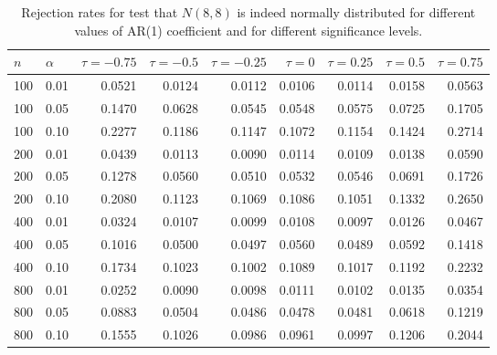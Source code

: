\begin{table}[ht]
\centering
\caption{Rejection rates for test that $N(8, 8)$ is indeed
                   normally distributed for
                   different values of AR(1) coefficient and for different 
                   significance levels.} 
\label{table:rr_norm}
\begin{tabular}{llrrrrrrr}
  \hline
$n$ & $\alpha$ & $\tau = -0.75$ & $\tau = -0.5$ & $\tau = -0.25$ & $\tau = 0$ & $\tau = 0.25$ & $\tau = 0.5$ & $\tau = 0.75$ \\ 
  \hline
100 & 0.01 & 0.0521 & 0.0124 & 0.0112 & 0.0106 & 0.0114 & 0.0158 & 0.0563 \\ 
  100 & 0.05 & 0.1470 & 0.0628 & 0.0545 & 0.0548 & 0.0575 & 0.0725 & 0.1705 \\ 
  100 & 0.10 & 0.2277 & 0.1186 & 0.1147 & 0.1072 & 0.1154 & 0.1424 & 0.2714 \\ 
  200 & 0.01 & 0.0439 & 0.0113 & 0.0090 & 0.0114 & 0.0109 & 0.0138 & 0.0590 \\ 
  200 & 0.05 & 0.1278 & 0.0560 & 0.0510 & 0.0532 & 0.0546 & 0.0691 & 0.1726 \\ 
  200 & 0.10 & 0.2080 & 0.1123 & 0.1069 & 0.1086 & 0.1051 & 0.1332 & 0.2650 \\ 
  400 & 0.01 & 0.0324 & 0.0107 & 0.0099 & 0.0108 & 0.0097 & 0.0126 & 0.0467 \\ 
  400 & 0.05 & 0.1016 & 0.0500 & 0.0497 & 0.0560 & 0.0489 & 0.0592 & 0.1418 \\ 
  400 & 0.10 & 0.1734 & 0.1023 & 0.1002 & 0.1089 & 0.1017 & 0.1192 & 0.2232 \\ 
  800 & 0.01 & 0.0252 & 0.0090 & 0.0098 & 0.0111 & 0.0102 & 0.0135 & 0.0354 \\ 
  800 & 0.05 & 0.0883 & 0.0504 & 0.0486 & 0.0478 & 0.0481 & 0.0618 & 0.1219 \\ 
  800 & 0.10 & 0.1555 & 0.1026 & 0.0986 & 0.0961 & 0.0997 & 0.1206 & 0.2044 \\ 
   \hline
\end{tabular}
\end{table}

